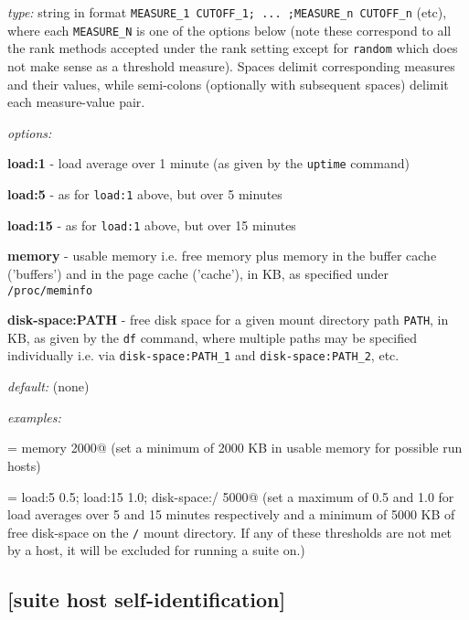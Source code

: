 \begin{myitemize}
\item {\em type:} string in format
\lstinline=MEASURE_1 CUTOFF_1; ... ;MEASURE_n CUTOFF_n= (etc),
where each \lstinline=MEASURE_N= is one of the options below (note
these correspond to all the rank methods accepted under the rank setting
except for \lstinline=random= which does not make sense as a threshold
measure). Spaces delimit corresponding measures and their values, while
semi-colons (optionally with subsequent spaces) delimit each measure-value
pair.
\item {\em options:}
    \begin{myitemize}
    \item {\bf load:1} - load average over 1 minute (as given by
the \lstinline=uptime= command)
    \item {\bf load:5} - as for \lstinline=load:1= above, but over 5 minutes
    \item {\bf load:15} - as for \lstinline=load:1= above, but over 15 minutes
    \item {\bf memory} - usable memory i.e. free memory plus memory in the
      buffer cache ('buffers') and in the page cache ('cache'), in KB, as
      specified under \lstinline=/proc/meminfo=
    \item {\bf disk-space:PATH} - free disk space for a given mount
directory path \lstinline=PATH=, in KB, as given by the \lstinline=df=
command, where multiple paths may be specified individually i.e. via
\lstinline=disk-space:PATH_1= and \lstinline=disk-space:PATH_2=, etc.
    \end{myitemize}
\item {\em default:} (none)
\item {\em examples:}
    \begin{myitemize}
            \item \lstinline@thresholds = memory 2000@ (set a minimum of 2000 KB in usable memory for possible run hosts)
            \item \lstinline@thresholds = load:5 0.5; load:15 1.0; disk-space:/ 5000@ (set a maximum of 0.5 and 1.0 for load averages over 5
and 15 minutes respectively and a minimum of 5000 KB of free disk-space on
the \lstinline=/= mount directory. If any of these thresholds are not met
by a host, it will be excluded for running a suite on.)
    \end{myitemize}
\end{myitemize}

\subsection{[suite host self-identification] }

